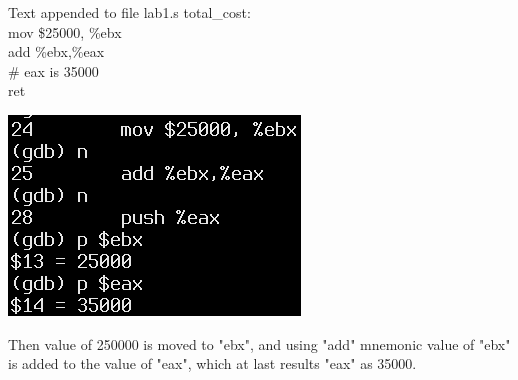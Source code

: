 \documentclass{article}
\begin{document}
\begin{multicols}{2}
\begin{GFT}{Text appended to file lab1.s}
\+  total\_cost:\\
\+  mov \$25000, \%ebx\\
\+  add \%ebx,\%eax \\
\+  \# eax is 35000\\
\+  ret\\
\end{GFT}
\columnbreak
\raggedleft
\includegraphics[scale=0.4]{tcasm.png}
\end{multicols}
Then value of 250000 is moved to "ebx", and using \hypertarget{5}{"add"} mnemonic value of "ebx" is added to the value of "eax", which at last results "eax" as 35000. \\
\noindent{\color{red}\rule{\linewidth}{0.5mm}} \\
\clearpage
\end{document}
